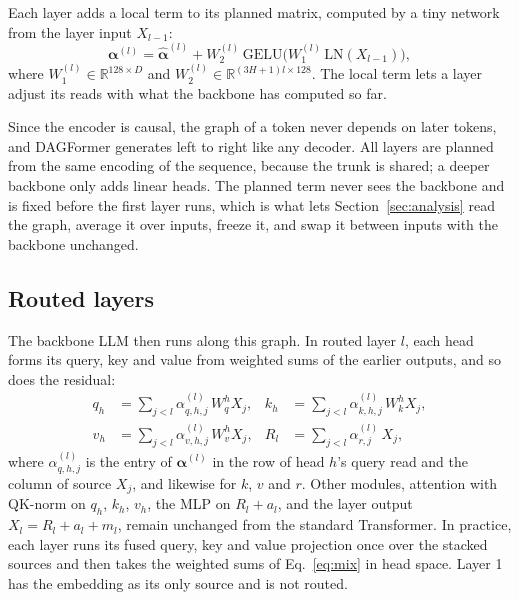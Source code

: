 \documentclass[11pt]{article}
\newcommand{\dagf}{DAGFormer}
\newcommand{\valpha}{\boldsymbol{\alpha}}
\begin{document}
Each layer adds a local term to its planned matrix, computed by a tiny network from the layer input $X_{l-1}$:
\begin{equation}
\valpha^{(l)} = \hat{\valpha}^{(l)} + W_2^{(l)}\,\mathrm{GELU}\big(W_1^{(l)}\,\mathrm{LN}(X_{l-1})\big),
\label{eq:refine}
\end{equation}
where $W_1^{(l)}\in\mathbb{R}^{128\times D}$ and $W_2^{(l)}\in\mathbb{R}^{(3H+1)l\times 128}$. The local term lets a layer adjust its reads with what the backbone has computed so far.

Since the encoder is causal, the graph of a token never depends on later tokens, and \dagf{} generates left to right like any decoder. All layers are planned from the same encoding of the sequence, because the trunk is shared; a deeper backbone only adds linear heads. The planned term never sees the backbone and is fixed before the first layer runs, which is what lets Section~\ref{sec:analysis} read the graph, average it over inputs, freeze it, and swap it between inputs with the backbone unchanged.

\subsection{Routed layers}
\label{sec:routed}

The backbone LLM then runs along this graph. In routed layer $l$, each head forms its query, key and value from weighted sums of the earlier outputs, and so does the residual:
\begin{equation}
\begin{aligned}
q_h &= \sum_{j<l}\alpha^{(l)}_{q,h,j}\,W_q^h X_j, & k_h &= \sum_{j<l}\alpha^{(l)}_{k,h,j}\,W_k^h X_j,\\
v_h &= \sum_{j<l}\alpha^{(l)}_{v,h,j}\,W_v^h X_j, & R_l &= \sum_{j<l}\alpha^{(l)}_{r,j}\,X_j,
\end{aligned}
\label{eq:mix}
\end{equation}
where $\alpha^{(l)}_{q,h,j}$ is the entry of $\valpha^{(l)}$ in the row of head $h$'s query read and the column of source $X_j$, and likewise for $k$, $v$ and $r$. Other modules, attention with QK-norm on $q_h$, $k_h$, $v_h$, the MLP on $R_l+a_l$, and the layer output $X_l=R_l+a_l+m_l$, remain unchanged from the standard Transformer. In practice, each layer runs its fused query, key and value projection once over the stacked sources and then takes the weighted sums of Eq.~\ref{eq:mix} in head space. Layer 1 has the embedding as its only source and is not routed.
\end{document}
